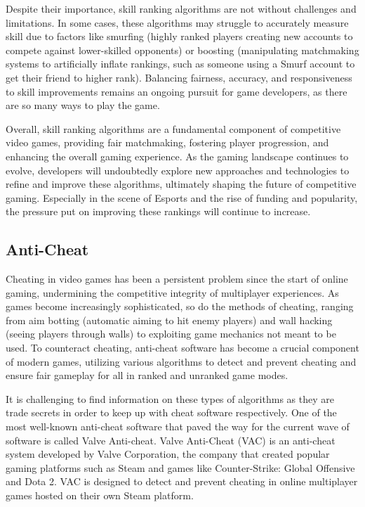 \documentclass{article}
\theoremstyle{theorem}
\theoremstyle{definition}
\theoremstyle{remark}
\begin{document}
\medskip\indent
Despite their importance, skill ranking algorithms are not without challenges and limitations. In some cases, these algorithms may struggle to accurately measure skill due to factors like smurfing (highly ranked players creating new accounts to compete against lower-skilled opponents) or boosting (manipulating matchmaking systems to artificially inflate rankings, such as someone using a Smurf account to get their friend to higher rank). Balancing fairness, accuracy, and responsiveness to skill improvements remains an ongoing pursuit for game developers, as there are so many ways to play the game. \cite{Csa}

\medskip\indent
Overall, skill ranking algorithms are a fundamental component of competitive video games, providing fair matchmaking, fostering player progression, and enhancing the overall gaming experience. As the gaming landscape continues to evolve, developers will undoubtedly explore new approaches and technologies to refine and improve these algorithms, ultimately shaping the future of competitive gaming. Especially in the scene of Esports and the rise of funding and popularity, the pressure put on improving these rankings will continue to increase.

\subsection{Anti-Cheat}

\medskip\indent
Cheating in video games has been a persistent problem since the start of online gaming, undermining the competitive integrity of multiplayer experiences. As games become increasingly sophisticated, so do the methods of cheating, ranging from aim botting (automatic aiming to hit enemy players) and wall hacking (seeing players through walls) to exploiting game mechanics not meant to be used. To counteract cheating, anti-cheat software has become a crucial component of modern games, utilizing various algorithms to detect and prevent cheating and ensure fair gameplay for all in ranked and unranked game modes.

\medskip\indent
It is challenging to find information on these types of algorithms as they are trade secrets in order to keep up with cheat software respectively. One of the most well-known anti-cheat software that paved the way for the current wave of software is called Valve Anti-cheat. Valve Anti-Cheat (VAC) is an anti-cheat system developed by Valve Corporation, the company that created popular gaming platforms such as Steam and games like Counter-Strike: Global Offensive and Dota 2. VAC is designed to detect and prevent cheating in online multiplayer games hosted on their own Steam platform.
\end{document}
